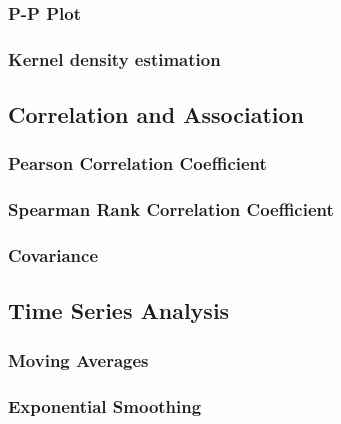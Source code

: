 \documentclass[11pt]{article}
\begin{document}
\hypertarget{p-p-plot}{%
\subsubsection{P-P Plot}\label{p-p-plot}}

\hypertarget{kernel-density-estimation}{%
\subsubsection{Kernel density estimation}\label{kernel-density-estimation}}

\hypertarget{correlation-and-association}{%
\subsection{Correlation and Association}\label{correlation-and-association}}

\hypertarget{pearson-correlation-coefficient}{%
\subsubsection{Pearson Correlation Coefficient}\label{pearson-correlation-coefficient}}

\hypertarget{spearman-rank-correlation-coefficient}{%
\subsubsection{Spearman Rank Correlation Coefficient}\label{spearman-rank-correlation-coefficient}}

\hypertarget{covariance}{%
\subsubsection{Covariance}\label{covariance}}

\hypertarget{time-series-analysis}{%
\subsection{Time Series Analysis}\label{time-series-analysis}}

\hypertarget{moving-averages}{%
\subsubsection{Moving Averages}\label{moving-averages}}

\hypertarget{exponential-smoothing}{%
\subsubsection{Exponential Smoothing}\label{exponential-smoothing}}
\end{document}
